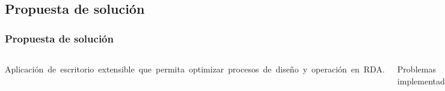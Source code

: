 \documentclass[9pt]{beamer}
\begin{document}
    \subsection{Propuesta de solución}
    \begin{frame}
        \frametitle{Propuesta de solución}
        
        \begin{columns}
            Aplicación de escritorio extensible que permita optimizar procesos de diseño y operación en RDA.\bigskip
    
            Problemas implementados:
            \begin{itemize}
                \item Problema de diseño de RDA basado en el costo de tuberías.
                \item Problema de operación basado en el Régimen de bombeo.
            \end{itemize}

            \begin{figure}
                \includegraphics[width=\textwidth]{assets/Relleno/Bombilla.png}
            \end{figure}
        \end{columns}

    \end{frame}
\end{document}
